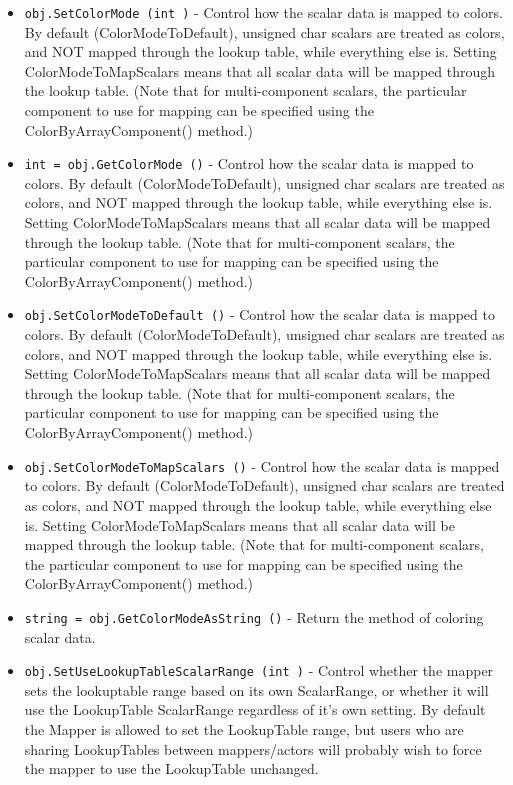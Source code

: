 \begin{itemize}
\item  \verb|obj.SetColorMode (int )| -  Control how the scalar data is mapped to colors.  By default
 (ColorModeToDefault), unsigned char scalars are treated as colors, and
 NOT mapped through the lookup table, while everything else is. Setting
 ColorModeToMapScalars means that all scalar data will be mapped through
 the lookup table.  (Note that for multi-component scalars, the
 particular component to use for mapping can be specified using the
 ColorByArrayComponent() method.)

\item  \verb|int = obj.GetColorMode ()| -  Control how the scalar data is mapped to colors.  By default
 (ColorModeToDefault), unsigned char scalars are treated as colors, and
 NOT mapped through the lookup table, while everything else is. Setting
 ColorModeToMapScalars means that all scalar data will be mapped through
 the lookup table.  (Note that for multi-component scalars, the
 particular component to use for mapping can be specified using the
 ColorByArrayComponent() method.)

\item  \verb|obj.SetColorModeToDefault ()| -  Control how the scalar data is mapped to colors.  By default
 (ColorModeToDefault), unsigned char scalars are treated as colors, and
 NOT mapped through the lookup table, while everything else is. Setting
 ColorModeToMapScalars means that all scalar data will be mapped through
 the lookup table.  (Note that for multi-component scalars, the
 particular component to use for mapping can be specified using the
 ColorByArrayComponent() method.)

\item  \verb|obj.SetColorModeToMapScalars ()| -  Control how the scalar data is mapped to colors.  By default
 (ColorModeToDefault), unsigned char scalars are treated as colors, and
 NOT mapped through the lookup table, while everything else is. Setting
 ColorModeToMapScalars means that all scalar data will be mapped through
 the lookup table.  (Note that for multi-component scalars, the
 particular component to use for mapping can be specified using the
 ColorByArrayComponent() method.)

\item  \verb|string = obj.GetColorModeAsString ()| -  Return the method of coloring scalar data.

\item  \verb|obj.SetUseLookupTableScalarRange (int )| -  Control whether the mapper sets the lookuptable range based on its
 own ScalarRange, or whether it will use the LookupTable ScalarRange
 regardless of it's own setting. By default the Mapper is allowed to set
 the LookupTable range, but users who are sharing LookupTables between
 mappers/actors will probably wish to force the mapper to use the
 LookupTable unchanged.


\end{itemize}
